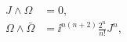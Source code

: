 \begin{equation}
\label{SUn}
\begin{aligned}
   J \wedge \Omega &= 0 , \\
   \Omega \wedge \bar{\Omega} &= \ii^{n(n+2)}\frac{2^n}{n!}J^n ,
\end{aligned}
\end{equation}

